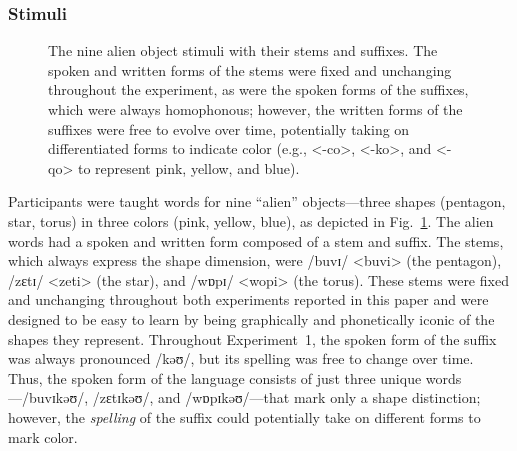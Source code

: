 \documentclass[doc,biblatex]{apa7}
\begin{document}
\subsubsection{Stimuli}

	\begin{figure}
	\vspace*{2pt}
	\caption{The nine alien object stimuli with their stems and suffixes. The spoken and written forms of the stems were fixed and unchanging throughout the experiment, as were the spoken forms of the suffixes, which were always homophonous; however, the written forms of the suffixes were free to evolve over time, potentially taking on differentiated forms to indicate color (e.g., <-co>, <-ko>, and <-qo> to represent pink, yellow, and blue).}
	\label{stimuli}
	\end{figure}

Participants were taught words for nine ``alien'' objects---three shapes (pentagon, star, torus) in three colors (pink, yellow, blue), as depicted in Fig.~\ref{stimuli}. The alien words had a spoken and written form composed of a stem and suffix. The stems, which always express the shape dimension, were /buvɪ/ <buvi> (the pentagon), /zɛtɪ/ <zeti> (the star), and /wɒpɪ/ <wopi> (the torus). These stems were fixed and unchanging throughout both experiments reported in this paper and were designed to be easy to learn by being graphically and phonetically iconic of the shapes they represent. Throughout Experiment~1, the spoken form of the suffix was always pronounced /kəʊ/, but its spelling was free to change over time. Thus, the spoken form of the language consists of just three unique words---/buvɪkəʊ/, /zɛtɪkəʊ/, and /wɒpɪkəʊ/---that mark only a shape distinction; however, the \textit{spelling} of the suffix could potentially take on different forms to mark color.
\end{document}
